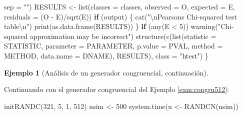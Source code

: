 \documentclass[
]{book}
\newenvironment{Shaded}{\begin{snugshade}}{\end{snugshade}}
\newcommand{\AttributeTok}[1]{\textcolor[rgb]{0.77,0.63,0.00}{#1}}
\newcommand{\ControlFlowTok}[1]{\textcolor[rgb]{0.13,0.29,0.53}{\textbf{#1}}}
\newcommand{\DecValTok}[1]{\textcolor[rgb]{0.00,0.00,0.81}{#1}}
\newcommand{\FunctionTok}[1]{\textcolor[rgb]{0.00,0.00,0.00}{#1}}
\newcommand{\NormalTok}[1]{#1}
\newcommand{\OtherTok}[1]{\textcolor[rgb]{0.56,0.35,0.01}{#1}}
\newcommand{\SpecialCharTok}[1]{\textcolor[rgb]{0.00,0.00,0.00}{#1}}
\newcommand{\StringTok}[1]{\textcolor[rgb]{0.31,0.60,0.02}{#1}}
\theoremstyle{break}
\theoremstyle{definition}
\theoremstyle{definition}
\newtheorem{example}{Ejemplo}[chapter]
\theoremstyle{definition}
\theoremstyle{definition}
\theoremstyle{remark}
\begin{document}
\begin{Shaded}
\begin{Highlighting}[]
        \AttributeTok{sep =} \StringTok{""}\NormalTok{)}
\NormalTok{    RESULTS }\OtherTok{\textless{}{-}} \FunctionTok{list}\NormalTok{(}\AttributeTok{classes =}\NormalTok{ classes, }\AttributeTok{observed =}\NormalTok{ O, }\AttributeTok{expected =}\NormalTok{ E, }\AttributeTok{residuals =}\NormalTok{ (O }\SpecialCharTok{{-}} 
\NormalTok{        E)}\SpecialCharTok{/}\FunctionTok{sqrt}\NormalTok{(E))}
    \ControlFlowTok{if}\NormalTok{ (output) \{}
        \FunctionTok{cat}\NormalTok{(}\StringTok{"}\SpecialCharTok{\textbackslash{}n}\StringTok{Pearson\textquotesingle{}s Chi{-}squared test table}\SpecialCharTok{\textbackslash{}n}\StringTok{"}\NormalTok{)}
        \FunctionTok{print}\NormalTok{(}\FunctionTok{as.data.frame}\NormalTok{(RESULTS))}
\NormalTok{    \}}
    \ControlFlowTok{if}\NormalTok{ (}\FunctionTok{any}\NormalTok{(E }\SpecialCharTok{\textless{}} \DecValTok{5}\NormalTok{)) }
        \FunctionTok{warning}\NormalTok{(}\StringTok{"Chi{-}squared approximation may be incorrect"}\NormalTok{)}
    \FunctionTok{structure}\NormalTok{(}\FunctionTok{c}\NormalTok{(}\FunctionTok{list}\NormalTok{(}\AttributeTok{statistic =}\NormalTok{ STATISTIC, }\AttributeTok{parameter =}\NormalTok{ PARAMETER, }\AttributeTok{p.value =}\NormalTok{ PVAL, }
        \AttributeTok{method =}\NormalTok{ METHOD, }\AttributeTok{data.name =}\NormalTok{ DNAME), RESULTS), }\AttributeTok{class =} \StringTok{"htest"}\NormalTok{)}
\NormalTok{\}}
\end{Highlighting}
\end{Shaded}

\begin{example}[Análisis de un generador congruencial, continuación]
\protect\hypertarget{exm:congru512b}{}{\label{exm:congru512b} {} }
\end{example}

Continuando con el generador congruencial del Ejemplo \ref{exm:congru512}:

\begin{Shaded}
\begin{Highlighting}[]
\FunctionTok{initRANDC}\NormalTok{(}\DecValTok{321}\NormalTok{, }\DecValTok{5}\NormalTok{, }\DecValTok{1}\NormalTok{, }\DecValTok{512}\NormalTok{)}
\NormalTok{nsim }\OtherTok{\textless{}{-}} \DecValTok{500}
\FunctionTok{system.time}\NormalTok{(u }\OtherTok{\textless{}{-}} \FunctionTok{RANDCN}\NormalTok{(nsim))}
\end{Highlighting}
\end{Shaded}
\end{document}
